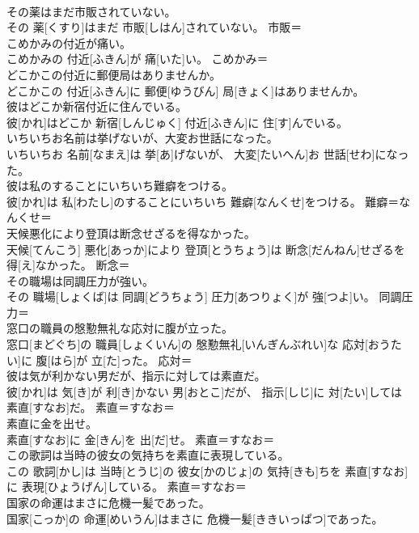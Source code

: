 \documentclass[8pt]{extreport}
\begin{document}
\begin{CJK}{UTF8}{min}
\\	その薬はまだ市販されていない。	
\\	その 薬[くすり]はまだ 市販[しはん]されていない。	市販＝ 
\\	こめかみの付近が痛い。	
\\	こめかみの 付近[ふきん]が 痛[いた]い。	こめかみ＝ 
\\	どこかこの付近に郵便局はありませんか。	
\\	どこかこの 付近[ふきん]に 郵便[ゆうびん] 局[きょく]はありませんか。	
\\	彼はどこか新宿付近に住んでいる。	
\\	彼[かれ]はどこか 新宿[しんじゅく] 付近[ふきん]に 住[す]んでいる。	
\\	いちいちお名前は挙げないが、大変お世話になった。	
\\	いちいちお 名前[なまえ]は 挙[あ]げないが、 大変[たいへん]お 世話[せわ]になった。	
\\	彼は私のすることにいちいち難癖をつける。	
\\	彼[かれ]は 私[わたし]のすることにいちいち 難癖[なんくせ]をつける。	難癖＝なんくせ＝ 
\\	天候悪化により登頂は断念せざるを得なかった。	
\\	天候[てんこう] 悪化[あっか]により 登頂[とうちょう]は 断念[だんねん]せざるを 得[え]なかった。	断念＝ 
\\	その職場は同調圧力が強い。	
\\	その 職場[しょくば]は 同調[どうちょう] 圧力[あつりょく]が 強[つよ]い。	同調圧力＝ 
\\	窓口の職員の慇懃無礼な応対に腹が立った。	
\\	窓口[まどぐち]の 職員[しょくいん]の 慇懃無礼[いんぎんぶれい]な 応対[おうたい]に 腹[はら]が 立[た]った。	応対＝ 
\\	彼は気が利かない男だが、指示に対しては素直だ。	
\\	彼[かれ]は 気[き]が 利[き]かない 男[おとこ]だが、 指示[しじ]に 対[たい]しては 素直[すなお]だ。	素直＝すなお＝ 
\\	素直に金を出せ。	
\\	素直[すなお]に 金[きん]を 出[だ]せ。	素直＝すなお＝ 
\\	この歌詞は当時の彼女の気持ちを素直に表現している。	
\\	この 歌詞[かし]は 当時[とうじ]の 彼女[かのじょ]の 気持[きも]ちを 素直[すなお]に 表現[ひょうげん]している。	素直＝すなお＝ 
\\	国家の命運はまさに危機一髪であった。	
\\	国家[こっか]の 命運[めいうん]はまさに 危機一髪[ききいっぱつ]であった。	

\end{CJK}
\end{document}
